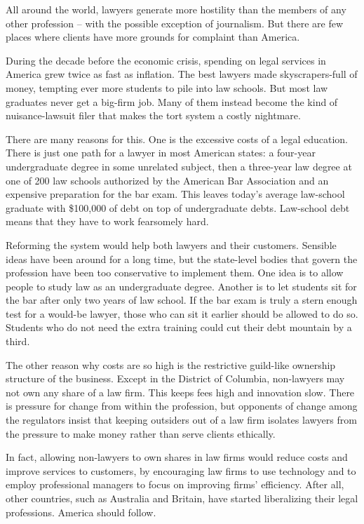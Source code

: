 All around the world, lawyers generate more hostility than the members of any other profession – with the possible exception of journalism. But there are few places where clients have more grounds for complaint than America.


During the decade before the economic crisis, spending on legal services in America grew twice as fast as inflation. The best lawyers made skyscrapers-full of money, tempting ever more students to pile into law schools. But most law graduates never get a big-firm job. Many of them instead become the kind of nuisance-lawsuit filer that makes the tort system a costly nightmare.


There are many reasons for this. One is the excessive costs of a legal education. There is just one path for a lawyer in most American states: a four-year undergraduate degree in some unrelated subject, then a three-year law degree at one of 200 law schools authorized by the American Bar Association and an expensive preparation for the bar exam. This leaves today's average law-school graduate with \$100,000 of debt on top of undergraduate debts. Law-school debt means that they have to work fearsomely hard.


Reforming the system would help both lawyers and their customers. Sensible ideas have been around for a long time, but the state-level bodies that govern the profession have been too conservative to implement them. One idea is to allow people to study law as an undergraduate degree. Another is to let students sit for the bar after only two years of law school. If the bar exam is truly a stern enough test for a would-be lawyer, those who can sit it earlier should be allowed to do so. Students who do not need the extra training could cut their debt mountain by a third.


The other reason why costs are so high is the restrictive guild-like ownership structure of the business. Except in the District of Columbia, non-lawyers may not own any share of a law firm. This keeps fees high and innovation slow. There is pressure for change from within the profession, but opponents of change among the regulators insist that keeping outsiders out of a law firm isolates lawyers from the pressure to make money rather than serve clients ethically.


In fact, allowing non-lawyers to own shares in law firms would reduce costs  and improve services to customers, by encouraging law firms to use technology and to employ professional managers to focus on improving firms' efficiency. After all, other countries, such as Australia and Britain, have started liberalizing their legal professions. America should follow.


